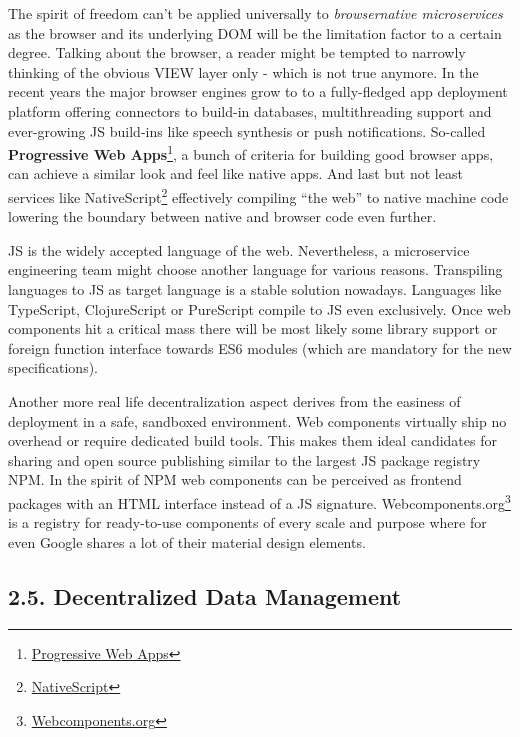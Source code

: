 \documentclass[]{article}
\begin{document}
The spirit of freedom can't be applied universally to
\emph{browsernative microservices} as the browser and its underlying DOM
will be the limitation factor to a certain degree. Talking about the
browser, a reader might be tempted to narrowly thinking of the obvious
VIEW layer only - which is not true anymore. In the recent years the
major browser engines grow to to a fully-fledged app deployment platform
offering connectors to build-in databases, multithreading support and
ever-growing JS build-ins like speech synthesis or push notifications.
So-called \textbf{Progressive Web Apps}\footnote{\href{https://developers.google.com/web/progressive-web-apps}{Progressive
  Web Apps}}, a bunch of criteria for building good browser apps, can
achieve a similar look and feel like native apps. And last but not least
services like NativeScript\footnote{\href{https://www.nativescript.org}{NativeScript}}
effectively compiling ``the web'' to native machine code lowering the
boundary between native and browser code even further.

JS is the widely accepted language of the web. Nevertheless, a
microservice engineering team might choose another language for various
reasons. Transpiling languages to JS as target language is a stable
solution nowadays. Languages like TypeScript, ClojureScript or
PureScript compile to JS even exclusively. Once web components hit a
critical mass there will be most likely some library support or foreign
function interface towards ES6 modules (which are mandatory for the new
specifications).

Another more real life decentralization aspect derives from the easiness
of deployment in a safe, sandboxed environment. Web components virtually
ship no overhead or require dedicated build tools. This makes them ideal
candidates for sharing and open source publishing similar to the largest
JS package registry NPM. In the spirit of NPM web components can be
perceived as frontend packages with an HTML interface instead of a JS
signature. Webcomponents.org\footnote{\href{https://webcomponents.org}{Webcomponents.org}}
is a registry for ready-to-use components of every scale and purpose
where for even Google shares a lot of their material design elements.

\subsection{2.5. Decentralized Data
Management}\label{decentralized-data-management}
\end{document}
